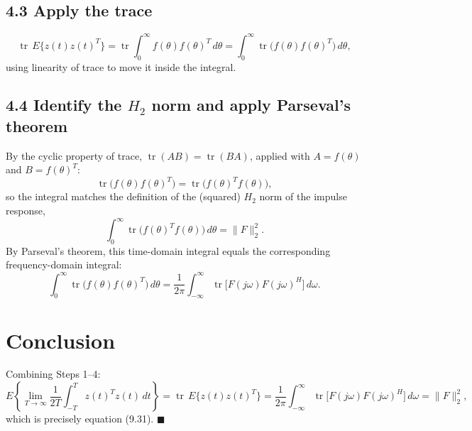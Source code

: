 \subsection*{4.3 Apply the trace}

\[
    \operatorname{tr}\,E\{z(t)z(t)^T\} = \operatorname{tr}\int_0^\infty f(\theta)f(\theta)^T\,d\theta = \int_0^\infty \operatorname{tr}\big(f(\theta)f(\theta)^T\big)\,d\theta,
\]
using linearity of trace to move it inside the integral.

\subsection*{4.4 Identify the $H_2$ norm and apply Parseval's theorem}

By the cyclic property of trace, $\operatorname{tr}(AB) = \operatorname{tr}(BA)$, applied with $A = f(\theta)$ and $B = f(\theta)^T$:
\[
    \operatorname{tr}\big(f(\theta)f(\theta)^T\big) = \operatorname{tr}\big(f(\theta)^Tf(\theta)\big),
\]
so the integral matches the definition of the (squared) $H_2$ norm of the impulse response,
\[
    \int_0^\infty \operatorname{tr}\big(f(\theta)^Tf(\theta)\big)\,d\theta = \|F\|_2^2.
\]
By Parseval's theorem, this time-domain integral equals the corresponding frequency-domain integral:
\[
    \int_0^\infty \operatorname{tr}\big(f(\theta)f(\theta)^T\big)\,d\theta
    = \frac{1}{2\pi}\int_{-\infty}^{\infty} \operatorname{tr}\big[F(j\omega)F(j\omega)^H\big]\,d\omega.
\]

\section*{Conclusion}

Combining Steps 1--4:
\[
    E\left\{\lim_{T\to\infty}\frac{1}{2T}\int_{-T}^{T} z(t)^Tz(t)\,dt\right\}
    = \operatorname{tr}\,E\{z(t)z(t)^T\}
    = \frac{1}{2\pi}\int_{-\infty}^{\infty}\operatorname{tr}\big[F(j\omega)F(j\omega)^H\big]\,d\omega
    = \|F\|_2^2,
\]
which is precisely equation (9.31). $\blacksquare$
